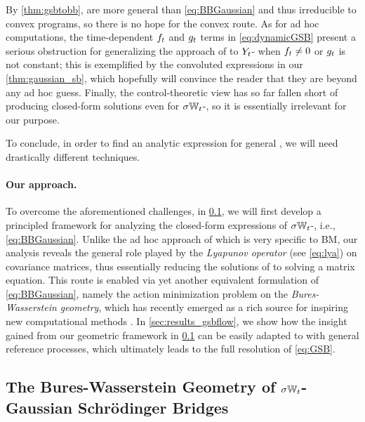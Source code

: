 By \cref{thm:gsbtobb},  are more general than \eqref{eq:BBGaussian} and thus irreducible to convex programs, so there is no hope for the convex route. As for ad hoc computations, the time-dependent $\driftf$ and $\volat[\ctime]$ terms in \eqref{eq:dynamicGSB} present a serious obstruction for generalizing the approach of \citet{mallasto2021entropy} to $\refsde$- when $\driftf \neq 0$ or $\volat[\ctime]$ is not constant; this is exemplified by the convoluted expressions in our \cref{thm:gaussian_sb}, which hopefully will convince the reader that they are beyond any ad hoc guess. Finally, the control-theoretic view has so far fallen short of producing closed-form solutions even for $\sigma\Wiener$-, so it is essentially irrelevant for our purpose. 

To conclude, in order to find an analytic expression for general , we will need drastically different techniques.

\paragraph{Our approach.}

To overcome the aforementioned challenges, in \cref{sec:mechanics_gsbflow}, we will first develop a principled framework for analyzing the closed-form expressions of $\sigma\Wiener$-, i.e., \eqref{eq:BBGaussian}. Unlike the ad hoc approach of \citet{mallasto2021entropy} which is very specific to \acrlong{BM}, our analysis reveals the general role played by the \emph{Lyapunov operator} (see \eqref{eq:lya}) on covariance matrices, thus essentially reducing the solutions of  to solving a matrix equation. This route is enabled via yet another equivalent formulation of \eqref{eq:BBGaussian}, namely the action minimization problem on the \emph{Bures-Wasserstein geometry}, which has recently emerged as a rich source for inspiring new computational methods \citep{chewi2020gradient, altschuler2021averaging, han2021riemannian}. In \cref{sec:results_gsbflow}, we show how the insight gained from our geometric framework in \cref{sec:mechanics_gsbflow} can be easily adapted to  with general reference processes, which ultimately leads to the full resolution of \eqref{eq:GSB}.

\subsection{The Bures-Wasserstein Geometry of $\sigma\Wiener$-Gaussian Schr{\"o}dinger Bridges}
\label{sec:mechanics_gsbflow}

